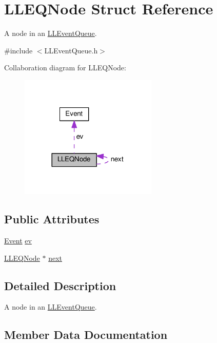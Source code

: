 \hypertarget{struct_l_l_e_q_node}{}\section{L\+L\+E\+Q\+Node Struct Reference}
\label{struct_l_l_e_q_node}


A node in an \hyperlink{class_l_l_event_queue}{L\+L\+Event\+Queue}.  




{\ttfamily \#include $<$L\+L\+Event\+Queue.\+h$>$}



Collaboration diagram for L\+L\+E\+Q\+Node\+:
\nopagebreak
\begin{figure}[H]
\begin{center}
\leavevmode
\includegraphics[width=185pt]{struct_l_l_e_q_node__coll__graph}
\end{center}
\end{figure}
\subsection*{Public Attributes}
\begin{DoxyCompactItemize}
\item 
\hyperlink{struct_event}{Event} \hyperlink{struct_l_l_e_q_node_a93737f2108ade25891fbbc3359a62e32}{ev}
\item 
\hyperlink{struct_l_l_e_q_node}{L\+L\+E\+Q\+Node} $\ast$ \hyperlink{struct_l_l_e_q_node_a7c95e7d5f2e3d03def48228b509212f6}{next}
\end{DoxyCompactItemize}


\subsection{Detailed Description}
A node in an \hyperlink{class_l_l_event_queue}{L\+L\+Event\+Queue}. 

\subsection{Member Data Documentation}
